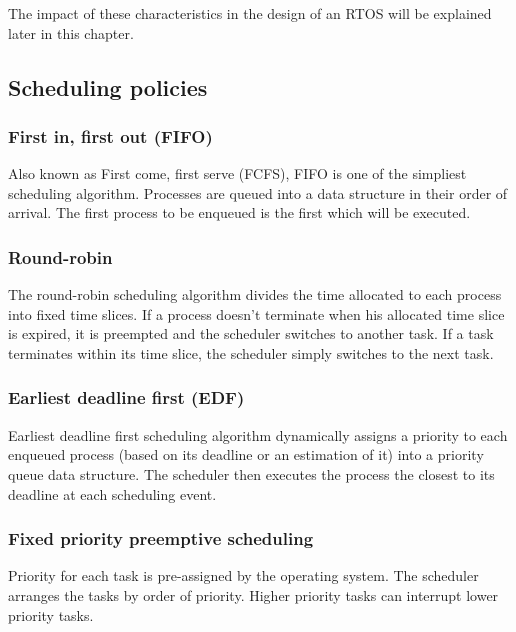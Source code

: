 The impact of these characteristics in the design of an RTOS will be explained later in this chapter.

\subsection{Scheduling policies}

\subsubsection{First in, first out (FIFO)}
Also known as First come, first serve (FCFS), FIFO is one of the simpliest scheduling algorithm.
Processes are queued into a data structure in their order of arrival.
The first process to be enqueued is the first which will be executed.

\subsubsection{Round-robin}
The round-robin scheduling algorithm divides the time allocated to each process into fixed time slices.
If a process doesn't terminate when his allocated time slice is expired, it is preempted and the scheduler switches to another task.
If a task terminates within its time slice, the scheduler simply switches to the next task.

\subsubsection{Earliest deadline first (EDF)}
Earliest deadline first scheduling algorithm dynamically assigns a priority
    to each enqueued process (based on its deadline or an estimation of it) into a priority queue data structure.
The scheduler then executes the process the closest to its deadline at each scheduling event.

\subsubsection{Fixed priority preemptive scheduling}
Priority for each task is pre-assigned by the operating system.
The scheduler arranges the tasks by order of priority.
Higher priority tasks can interrupt lower priority tasks.

